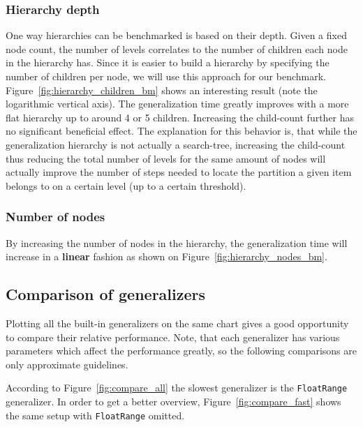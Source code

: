 \subsubsection{Hierarchy depth}
One way hierarchies can be benchmarked is based on their depth. Given a fixed node count, the number of levels correlates to the number of children each node in the hierarchy has. Since it is easier to build a hierarchy by specifying the number of children per node, we will use this approach for our benchmark. Figure~\ref{fig:hierarchy_children_bm} shows an interesting result (note the logarithmic vertical axis). The generalization time greatly improves with a more flat hierarchy up to around 4 or 5 children. Increasing the child-count further has no significant beneficial effect. The explanation for this behavior is, that while the generalization hierarchy is not actually a search-tree, increasing the child-count thus reducing the total number of levels for the same amount of nodes will actually improve the number of steps needed to locate the partition a given item belongs to on a certain level (up to a certain threshold).
\vspace{\baselineskip}


\subsubsection{Number of nodes}
By increasing the number of nodes in the hierarchy, the generalization time will increase in a \textbf{linear} fashion as shown on Figure~\ref{fig:hierarchy_nodes_bm}.
\vspace{\baselineskip}


\subsection{Comparison of generalizers}

Plotting all the built-in generalizers on the same chart gives a good opportunity to compare their relative performance. Note, that each generalizer has various parameters which affect the performance greatly, so the following comparisons are only approximate guidelines.

According to Figure~\ref{fig:compare_all} the slowest generalizer is the \texttt{FloatRange} generalizer. In order to get a better overview, Figure~\ref{fig:compare_fast} shows the same setup with \texttt{FloatRange} omitted.

